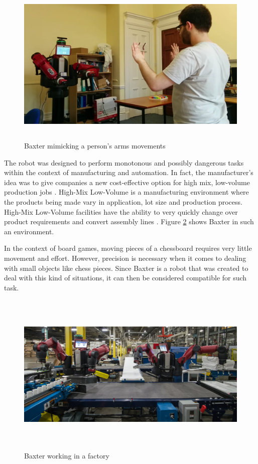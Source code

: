 \documentclass{l4proj}
\begin{document}
\vspace{25mm}
\begin{figure}[h!]
\centering
\includegraphics[height=7.87cm,width=14cm]{mimic.png} 
\vspace{2mm}
\caption{Baxter mimicking a person's arms movements \cite{Mimicking}}
\label{Baxter_mimicking}
\end{figure}



The robot was designed to perform monotonous and possibly dangerous tasks within the context of manufacturing and automation. In fact, the manufacturer's idea was to give companies a new cost-effective option for high mix, low-volume production jobs \cite{RethinkRobotics}. High-Mix Low-Volume is a manufacturing environment where the products being made vary in application, lot size and production process. High-Mix Low-Volume facilities have the ability to very quickly change over product requirements and convert assembly lines \cite{HighMixLowVolume}. Figure \ref{Baxter_working} shows Baxter in such an environment.

In the context of board games, moving pieces of a chessboard requires very little movement and effort. However, precision is necessary when it comes to dealing with small objects like chess pieces. Since Baxter is a robot that was created to deal with this kind of situations, it can then be considered compatible for such task.

\vspace{10mm}
\begin{figure}[h!]
\centering
\includegraphics[height=7.87cm,width=14cm]{baxter_working.jpg}
\caption{Baxter working in a factory \cite{RethinkRobotics}}
\label{Baxter_working}
\end{figure}
\end{document}
